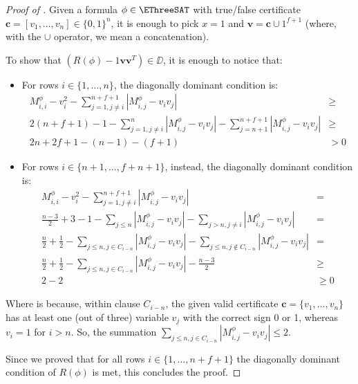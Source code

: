 \begin{proof}[Proof of ]
	Given a formula $\phi\in\EThreeSAT$ with true/false certificate $\mathbf{c}=[v_1, \dots, v_n]\in\{0,1\}^n$, it is enough to pick $x=1$ and $\mathbf{v} = \mathbf{c} \cup 1^{f+1}$ (where, with the $\cup$ operator, we mean a concatenation).
	
	To show that $(R(\phi) - 1 \mathbf{vv}^T) \in \DD$, it is enough to notice that:
	
	\begin{itemize}
		\item For rows $i\in\{1, \dots, n\}$, the diagonally dominant condition is: 
		\begin{align}
			M_{i,i}^\phi - v_i^2 - \sum_{j=1,j\neq i}^{n+f+1} |M_{i,j}^\phi - v_i v_j| & \geq \\
			2(n+f+1) - 1 - \sum_{j=1,j\neq i}^{n} |M_{i,j}^\phi - v_i v_j| - \sum_{j=n+1}^{n+f+1} |M_{i,j}^\phi - v_i v_j| & \geq \\
			2n + 2f + 1 - (n-1) - (f+1) & > 0
		\end{align}
		\item For rows $i\in\{n+1, \dots, f+n+1\}$, instead, the diagonally dominant condition is:
		\begin{align}
			M_{i,i}^\phi - v_i^2 - \sum_{j=1, j\neq i}^{n+f+1} |M_{i,j}^\phi - v_i v_j| & = \\
			\frac{n-3}{2}+3 - 1 - \sum_{j\leq n }|M_{i,j}^\phi - v_i v_j| - \sum_{j>n, j\neq i} |M_{i,j}^\phi - v_i v_j| & = \\
			\frac{n}{2} + \frac{1}{2} - \sum_{j\leq n, j\in C_{i-n}}|M_{i,j}^\phi - v_i v_j| - \sum_{j\leq n, j\notin C_{i-n}}|M_{i,j}^\phi - v_i v_j| & = \\
			\frac{n}{2} + \frac{1}{2} - \sum_{j\leq n, j\in C_{i-n}}|M_{i,j}^\phi - v_i v_j| - \frac{n-3}{2} & \geq \\
			2 - 2 & \geq 0 \label{eq:at_least_one_correct_sign}
		\end{align}
	\end{itemize}

Where  is because, within clause $C_{i-n}$, the given valid certificate $\mathbf{c} = \{v_1, \dots, v_n\}$ has at least one (out of three) variable $v_j$ with the correct sign 0 or 1, whereas $v_i=1$ for $i > n$. So, the summation $\sum_{j\leq n, j\in C_{i-n}}|M_{i,j}^\phi - v_i v_j| \leq 2 $.

Since we proved that for all rows $i\in\{1, \dots, n+f+1\}$ the diagonally dominant condition of $R(\phi)$ is met, this concludes the proof.
\end{proof}

